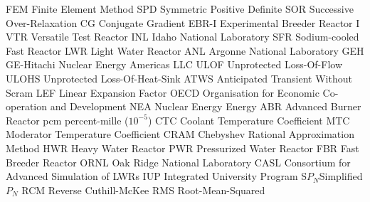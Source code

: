 \makeglossaries

   {FEM}   {Finite Element Method}
   {SPD}   {Symmetric Positive Definite}
   {SOR}   {Successive Over-Relaxation}
    {CG}    {Conjugate Gradient}
 {EBR-I} {Experimental Breeder Reactor I}
   {VTR}   {Versatile Test Reactor}
   {INL}   {Idaho National Laboratory}
   {SFR}   {Sodium-cooled Fast Reactor}
   {LWR}   {Light Water Reactor}
   {ANL}   {Argonne National Laboratory}
   {GEH}   {GE-Hitachi Nuclear Energy Americas LLC}
  {ULOF}  {Unprotected Loss-Of-Flow}
 {ULOHS} {Unprotected Loss-Of-Heat-Sink}
  {ATWS}  {Anticipated Transient Without Scram}
   {LEF}   {Linear Expansion Factor}
  {OECD}  {Organisation for Economic Co-operation and Development}
   {NEA}   {Nuclear Energy Energy}
   {ABR}   {Advanced Burner Reactor}
   {pcm}   {percent-mille ($10^{-5}$)}
   {CTC}   {Coolant Temperature Coefficient}
   {MTC}   {Moderator Temperature Coefficient}
  {CRAM}  {Chebyshev Rational Approximation Method}
   {HWR}   {Heavy Water Reactor}
   {PWR}   {Pressurized Water Reactor}
   {FBR}   {Fast Breeder Reactor}
  {ORNL}  {Oak Ridge National Laboratory}
  {CASL}  {Consortium for Advanced Simulation of LWRs}
   {IUP}   {Integrated University Program}
   {S$P_N$}{Simplified $P_N$}
   {RCM}   {Reverse Cuthill-McKee}
   {RMS}   {Root-Mean-Squared}
